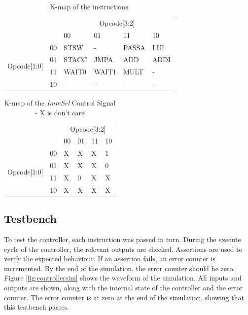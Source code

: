 

\begin{table}
\caption{K-map of the instructions}
\label{tab:kmap}
\centering
\begin{tabular}{|c|c|p{1.5cm}p{1.5cm}p{1.5cm}p{1.5cm}|}\cline{3-6}
\multicolumn{2}{c|}{} & \multicolumn{4}{|c|}{Opcode[3:2]} \\ \cline{3-6}
\multicolumn{2}{c|}{} 			& 00	& 01	& 11	& 10	\\  \hline
\multirow{4}{*}{Opcode[1:0]} 	& 00 	& STSW	& -	& PASSA	& LUI	\\
				& 01 	& STACC	& JMPA	& ADD	& ADDI	\\
				& 11 	& WAIT0	& WAIT1	& MULT	& -	\\
				& 10 	& -	& -	& -	& -	\\ \hline

\end{tabular}
\end{table}

\begin{table}
\caption{K-map of the \textit{ImmSel} Control Signal - X is don't care}
\label{tab:kmap:immsel}
\centering
\begin{tabular}{|c|c|p{1.5cm}p{1.5cm}p{1.5cm}p{1.5cm}|}\cline{3-6}
\multicolumn{2}{c|}{} & \multicolumn{4}{|c|}{Opcode[3:2]} \\ \cline{3-6}
\multicolumn{2}{c|}{} 			& 00	& 01	& 11	& 10	\\  \hline
\multirow{4}{*}{Opcode[1:0]} 	& 00 	& X	& X	& X	& 1	\\
				& 01 	& X	& X	& X	& 0	\\
				& 11 	& X	& 0 	& X	& X	\\
				& 10 	& X	& X	& X	& X	\\ \hline

\end{tabular}
\end{table}





\subsection{Testbench}

To test the controller, each instruction was passed in turn.
During the execute cycle of the controller, the relevant outputs are checked. 
Assertions are used to verify the expected behaviour. 
If an assertion fails, an error counter is incremented. 
By the end of the simulation, the error counter should be zero.
Figure \ref{fig:controllersim} shows the waveform of the simulation.
All inputs and outputs are shown, along with the internal state of the controller and the error counter.
The error counter is at zero at the end of the simulation, showing that this testbench passes. 

